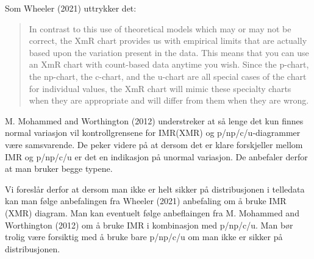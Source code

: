 \documentclass[
]{book}
\begin{document}
Som Wheeler (2021) uttrykker det:

\begin{quote}
In contrast to this use of theoretical models which may or may not be correct, the XmR chart provides us with empirical limits that are actually based upon the variation present in the data. This means that you can use an XmR chart with count-based data anytime you wish. Since the p-chart, the np-chart, the c-chart, and the u-chart are all special cases of the chart for individual values, the XmR chart will mimic these specialty charts when they are appropriate and will differ from them when they are wrong.
\end{quote}

M. Mohammed and Worthington (2012) understreker at så lenge det kun finnes normal variasjon vil kontrollgrensene for IMR(XMR) og p/np/c/u-diagrammer være samsvarende. De peker videre på at dersom det er klare forskjeller mellom IMR og p/np/c/u er det en indikasjon på unormal variasjon. De anbefaler derfor at man bruker begge typene.

Vi foreslår derfor at dersom man ikke er helt sikker på distribusjonen i telledata kan man følge anbefalingen fra Wheeler (2021) anbefaling om å bruke IMR (XMR) diagram. Man kan eventuelt følge anbeflaingen fra M. Mohammed and Worthington (2012) om å bruke IMR i kombinasjon med p/np/c/u. Man bør trolig være forsiktig med å bruke bare p/np/c/u om man ikke er sikker på distribusjonen.
\end{document}
